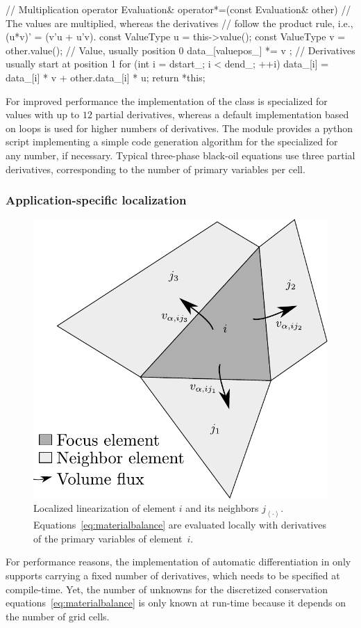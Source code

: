 \begin{c++}
// Multiplication operator 
Evaluation& operator*=(const Evaluation& other)
{
    // The values are multiplied, whereas the derivatives
    // follow the product rule, i.e., (u*v)' = (v'u + u'v).
    const ValueType u = this->value();
    const ValueType v = other.value();
    // Value, usually position 0
    data_[valuepos_] *= v ;
    //  Derivatives usually start at position 1
    for (int i = dstart_; i < dend_; ++i) {
        data_[i] = data_[i] * v + other.data_[i] * u;
    }
    return *this;
}
\end{c++}
For improved performance the implementation of the  class is
specialized for values with up to $12$ partial derivatives, whereas a default implementation based on  loops is used for higher numbers of
derivatives. The \opmmaterial module
provides a python script implementing a simple code generation algorithm for 
the specialized  for any number, if
necessary. Typical three-phase black-oil equations use three
partial derivatives, corresponding to the number of
primary variables per cell.

\subsubsection{Application-specific localization}

\begin{figure}
\center
\includegraphics[width=.45\linewidth]{figures/localized_linearization.pdf}
\caption{Localized linearization of element $i$ and its neighbors $j_{\left<\cdot\right>}$.
  Equations~\eqref{eq:materialbalance} are evaluated locally with
  derivatives of the primary variables of element~$i$.}
\label{fig:localized_linearization}
\end{figure}

For performance reasons, the implementation of automatic
differentiation in \opm only supports carrying a fixed number of
derivatives, which needs to be specified at compile-time. Yet, the
number of unknowns for the discretized conservation
equations~\eqref{eq:materialbalance} is only known at run-time because
it depends on the number of grid cells.

